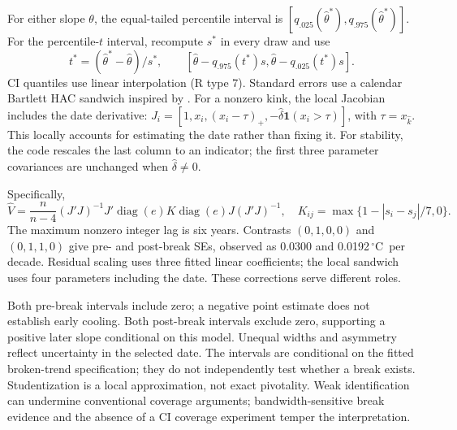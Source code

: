 \documentclass[11pt,a4paper]{article}
\newcommand{\degC}{\ensuremath{^{\circ}\mathrm C}}
\begin{document}
For either slope $\theta$, the equal-tailed percentile interval is $[q_{.025}(\widehat\theta^*),q_{.975}(\widehat\theta^*)]$. For the percentile-$t$ interval, recompute $s^*$ in every draw and use
\[
 t^*=(\widehat\theta^*-\widehat\theta)/s^*,\qquad [\widehat\theta-q_{.975}(t^*)s,\widehat\theta-q_{.025}(t^*)s].
\]
CI quantiles use linear interpolation (R type 7). Standard errors use a calendar Bartlett HAC sandwich inspired by \cite{newey}. For a nonzero kink, the local Jacobian includes the date derivative: $J_i=[1,x_i,(x_i-\tau)_+,-\widehat\delta\mathbf1(x_i>\tau)]$, with $\tau=x_{\widehat k}$. This locally accounts for estimating the date rather than fixing it. For stability, the code rescales the last column to an indicator; the first three parameter covariances are unchanged when $\widehat\delta\neq0$.

Specifically,
\[
 \widehat V=\frac{n}{n-4}(J'J)^{-1}J'\operatorname{diag}(e)K\operatorname{diag}(e)J(J'J)^{-1},\quad
 K_{ij}=\max\{1-|s_i-s_j|/7,0\}.
\]
The maximum nonzero integer lag is six years. Contrasts $(0,1,0,0)$ and $(0,1,1,0)$ give pre- and post-break SEs, observed as 0.0300 and 0.0192\,\degC\ per decade. Residual scaling uses three fitted linear coefficients; the local sandwich uses four parameters including the date. These corrections serve different roles.

\begin{table}[htbp]\centering\small
\caption{Nominal 95\% bootstrap slope intervals under the fitted alternative, in \degC\ per decade. Every draw reselects the break.}\label{tab:ci}\end{table}

Both pre-break intervals include zero; a negative point estimate does not establish early cooling. Both post-break intervals exclude zero, supporting a positive later slope conditional on this model. Unequal widths and asymmetry reflect uncertainty in the selected date. The intervals are conditional on the fitted broken-trend specification; they do not independently test whether a break exists. Studentization is a local approximation, not exact pivotality. Weak identification can undermine conventional coverage arguments; bandwidth-sensitive break evidence and the absence of a CI coverage experiment temper the interpretation.
\end{document}
